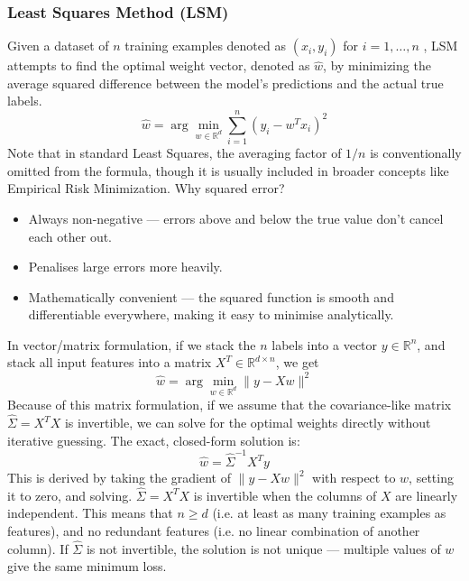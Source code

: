 \documentclass[../Probability.tex]{subfiles}
\begin{document}
\subsubsection{Least Squares Method (LSM)}
Given a dataset of $n$ training examples denoted as $(x_i, y_i)$ for $i = 1, \dots, n$ , LSM attempts to find the optimal weight vector, denoted as $\hat{w}$, by minimizing the average squared difference between the model's predictions and the actual true labels.
$$\hat{w} = \arg \min_{w \in \mathbb{R}^d} \sum_{i=1}^n (y_i - w^T x_i)^2$$
Note that in standard Least Squares, the averaging factor of $1/n$ is conventionally omitted from the formula, though it is usually included in broader concepts like Empirical Risk Minimization.\newline
Why squared error?
\begin{itemize}
    \item Always non-negative — errors above and below the true value don't cancel each other out.
    \item Penalises large errors more heavily.
    \item Mathematically convenient — the squared function is smooth and differentiable everywhere, making it easy to minimise analytically.
\end{itemize}
In vector/matrix formulation, if we stack the $n$ labels into a vector $y \in \mathbb{R}^n$, and stack all input features into a matrix $X^T \in \mathbb{R}^{d \times n}$, we get
$$\hat{w} = \arg \min_{w \in \mathbb{R}^d} \|y - Xw\|^2$$
Because of this matrix formulation, if we assume that the covariance-like matrix $\hat{\Sigma} = X^T X$ is invertible, we can solve for the optimal weights directly without iterative guessing. The exact, closed-form solution is:
$$\hat{w} = \hat{\Sigma}^{-1} X^T y$$
This is derived by taking the gradient of $\|y - Xw\|^2$ with respect to $w$, setting it to zero, and solving.
$\hat{\Sigma} = X^TX$ is invertible when the columns of $X$ are linearly independent. This means that $n \geq d$ (i.e. at least as many training examples as features), and no redundant features (i.e. no linear combination of another column).\newline
If $\hat{\Sigma}$ is not invertible, the solution is not unique — multiple values of $w$ give the same minimum loss.
\end{document}
